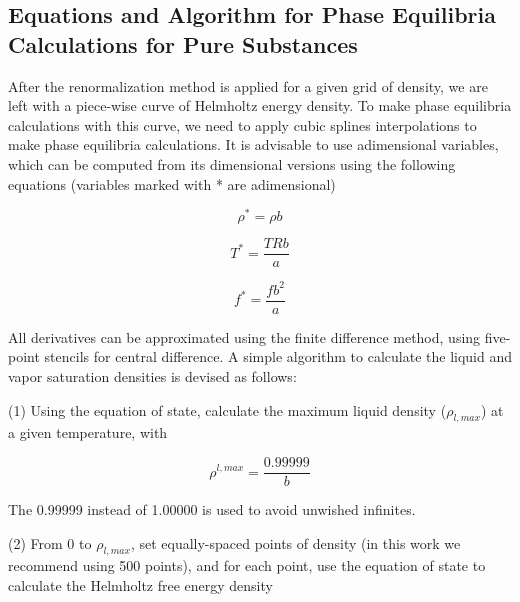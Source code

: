 \documentclass[preprint,12pt,3p]{elsarticle}
\begin{document}
\nomenclature[L]{}{}
\nomenclature[L]{}{}
\nomenclature[L]{}{}
\nomenclature[L]{}{}
\nomenclature[L]{}{}
\printnomenclature[5em]

\begin{appendices}
\renewcommand{\theequation}{\thesection.\arabic{equation}}
\setcounter{equation}{0}
\section{Equations and Algorithm for Phase Equilibria Calculations for Pure Substances}

	After the renormalization method is applied for a given grid of density, we are left with a piece-wise curve of Helmholtz energy density. To make phase equilibria calculations with this curve, we need to apply cubic splines interpolations to make phase equilibria calculations. It is advisable to use adimensional variables, which can be computed from its dimensional versions using the following equations (variables marked with * are adimensional)
	
\begin{equation} \label{eq:adim_dens}
	\rho^{*} = \rho b
\end{equation}	

\begin{equation} \label{eq:adim_T}
	T^{*} = \frac{TRb}{a}
\end{equation}	

\begin{equation} \label{eq:adim_f}
	f^{*} = \frac{fb^{2}}{a}
\end{equation}
	
	All derivatives can be approximated using the finite difference method, using five-point stencils for central difference. A simple algorithm to calculate the liquid and vapor saturation densities is devised as follows:
	
	(1) Using the equation of state, calculate the maximum liquid density ($\rho_{l,max}$) at a given temperature, with
	
\begin{equation} \label{eq:max_dens}
	\rho^{l,max} = \frac{0.99999}{b}
\end{equation}

	The 0.99999 instead of 1.00000 is used to avoid unwished infinites.
	
	(2) From 0 to $\rho_{l,max}$, set equally-spaced points of density (in this work we recommend using 500 points), and for each point, use the equation of state to calculate the Helmholtz free energy density
	

\end{appendices}
\end{document}
